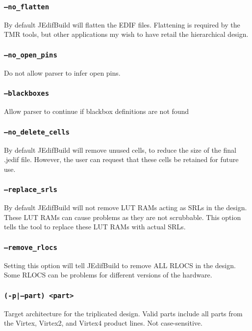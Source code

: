 \subsubsection{\texttt{--no\_flatten}}
By default JEdifBuild will flatten the EDIF files. Flattening is required by the 
TMR tools, but other applications my wish to have retail the hierarchical
design. 

\subsubsection{\texttt{--no\_open\_pins}}
Do not allow parser to infer open pins.

\subsubsection{\texttt{--blackboxes}}
Allow parser to continue if blackbox definitions are not found

\subsubsection{\texttt{--no\_delete\_cells}}
By default JEdifBuild will remove unused cells, to reduce the size of the final
.jedif file. However, the user can request that these cells be retained for 
future use.

\subsubsection{\texttt{--replace\_srls}}
By default JEdifBuild will not remove LUT RAMs acting as SRLs in the design.  These
LUT RAMs can cause problems as they are not scrubbable.  This option tells the 
tool to replace these LUT RAMs with actual SRLs.

\subsubsection{\texttt{--remove\_rlocs}}
Setting this option will tell JEdifBuild to remove ALL RLOCS in the design.  Some
RLOCS can be problems for different versions of the hardware.

\subsubsection{\texttt{(-p|--part) <part>}}
Target architecture for the triplicated design. Valid parts include all
parts from the Virtex, Virtex2, and Virtex4 product lines. Not
case-sensitive.

%
%



